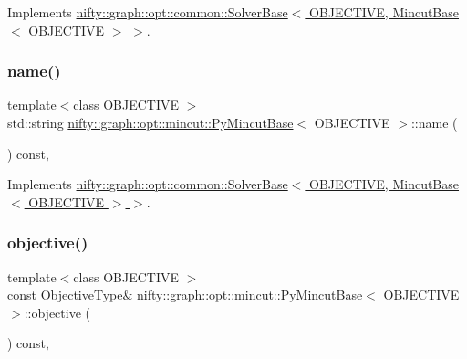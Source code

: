 Implements \hyperlink{classnifty_1_1graph_1_1opt_1_1common_1_1SolverBase_a7bbe01ee201cf3157b251e54c5ff0619}{nifty\+::graph\+::opt\+::common\+::\+Solver\+Base$<$ O\+B\+J\+E\+C\+T\+I\+V\+E, Mincut\+Base$<$ O\+B\+J\+E\+C\+T\+I\+V\+E $>$ $>$}.

\mbox{\label{classnifty_1_1graph_1_1opt_1_1mincut_1_1PyMincutBase_a0c9a8b12b5a09262a007ae964fb04b04}} 
\subsubsection{\texorpdfstring{name()}{name()}}
{\footnotesize\ttfamily template$<$class O\+B\+J\+E\+C\+T\+I\+VE $>$ \\
std\+::string \hyperlink{classnifty_1_1graph_1_1opt_1_1mincut_1_1PyMincutBase}{nifty\+::graph\+::opt\+::mincut\+::\+Py\+Mincut\+Base}$<$ O\+B\+J\+E\+C\+T\+I\+VE $>$\+::name (\begin{DoxyParamCaption}{ }\end{DoxyParamCaption}) const\hspace{0.3cm}{\ttfamily [inline]}, {\ttfamily [virtual]}}



Implements \hyperlink{classnifty_1_1graph_1_1opt_1_1common_1_1SolverBase_af638b9a804cfec3e35fe87c77e942d30}{nifty\+::graph\+::opt\+::common\+::\+Solver\+Base$<$ O\+B\+J\+E\+C\+T\+I\+V\+E, Mincut\+Base$<$ O\+B\+J\+E\+C\+T\+I\+V\+E $>$ $>$}.

\mbox{\label{classnifty_1_1graph_1_1opt_1_1mincut_1_1PyMincutBase_a9eb51467ec7c3ca43c2df86237030deb}} 
\subsubsection{\texorpdfstring{objective()}{objective()}}
{\footnotesize\ttfamily template$<$class O\+B\+J\+E\+C\+T\+I\+VE $>$ \\
const \hyperlink{classnifty_1_1graph_1_1opt_1_1mincut_1_1PyMincutBase_ad5ee76481f2aeb8544717a69b2760a6b}{Objective\+Type}\& \hyperlink{classnifty_1_1graph_1_1opt_1_1mincut_1_1PyMincutBase}{nifty\+::graph\+::opt\+::mincut\+::\+Py\+Mincut\+Base}$<$ O\+B\+J\+E\+C\+T\+I\+VE $>$\+::objective (\begin{DoxyParamCaption}{ }\end{DoxyParamCaption}) const\hspace{0.3cm}{\ttfamily [inline]}, {\ttfamily [virtual]}}




